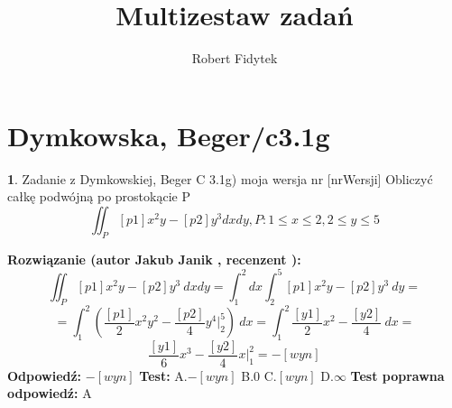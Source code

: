 \documentclass[12pt, a4paper]{article}
\title{Multizestaw zadań}
\author{Robert Fidytek}
\date{}
\theoremstyle{definition} %
\newtheorem{zad}{}
\newcommand{\kategoria}[1]{\section{#1}} %
\newcommand{\zadStart}[1]{\begin{zad}#1\newline} %
\newcommand{\zadStop}{\end{zad}}   %
\newcommand{\rozwStart}[2]{\noindent \textbf{Rozwiązanie (autor #1 , recenzent #2): }\newline} %
\newcommand{\rozwStop}{\newline}                                            %
\newcommand{\odpStart}{\noindent \textbf{Odpowiedź:}\newline}    %
\newcommand{\odpStop}{\newline}                                             %
\newcommand{\testStart}{\noindent \textbf{Test:}\newline} %
\newcommand{\testStop}{\newline} %
\newcommand{\kluczStart}{\noindent \textbf{Test poprawna odpowiedź:}\newline} %
\newcommand{\kluczStop}{\newline} %
\begin{document}
\maketitle


\kategoria{Dymkowska, Beger/c3.1g}
\zadStart{Zadanie z Dymkowskiej, Beger C 3.1g) moja wersja nr [nrWersji]}
Obliczyć całkę podwójną po prostokącie P $$\iint_P [p1]x^2y-[p2]y^3 dxdy, P: 1\leq x \leq 2, 2 \leq y \leq 5$$
\zadStop
\rozwStart{Jakub Janik}{}
$$\iint_P [p1]x^2y-[p2]y^3\ dxdy=\int_1^2 dx \int_2^5 [p1]x^2 y - [p2]y^3\ dy=$$
$$=\int_1^2 (\frac{[p1]}{2}x^2 y^2-\frac{[p2]}{4}y^4 \Big|_2^5)\ dx=\int_1^2 \frac{[y1]}{2}x^2 - \frac{[y2]}{4}\ dx=$$
$$\frac{[y1]}{6}x^3 - \frac{[y2]}{4}x \Big|_1^2=-[wyn]$$
\rozwStop
\odpStart
$-[wyn]$
\odpStop
\testStart
A.$-[wyn]$
B.$0$
C.$[wyn]$
D.$\infty$
\testStop
\kluczStart
A
\kluczStop
\end{document}
